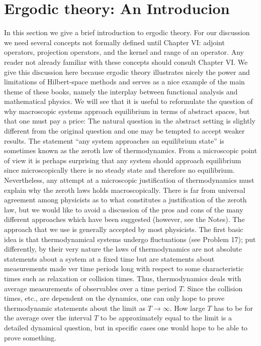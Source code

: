 \section{Ergodic theory: An Introducion}

In this section we give a brief introduction to ergodic theory. For our discussion we need several concepts not formally defined until Chapter VI: adjoint operators, projection operators, and the kernel and range of an operator. Any reader not already familiar with these concepts should consult Chapter VI. We give this discussion here because ergodic theory illustrates nicely the power and limitations of Hilbert-space methods and serves as a nice example of the main theme of these books, namely the interplay between functional analysis and mathematical physics. We will see that it is useful to reformulate the question of why macroscopic systems approach equilibrium in terms of abstract spaces, but that one must pay a price: The natural question in the abstract setting is slightly different from the original question and one may be tempted to accept weaker results. The statement \enquote{any system approaches an equilibrium state} is sometimes known as the zeroth law of thermodynamics. From a microscopic point of view it is perhaps surprising that any system should approach equilibrium since microscopically there is no steady state and therefore no equilibrium.
Nevertheless, any attempt at a microscopic justification of thermodynamics must explain why the zeroth laws holds macroscopically. There is far from universal agreement among physicists as to what constitutes a justification of the zeroth law, but we would like to avoid a discussion of the pros and cons of the many different approaches which have been suggested (however, see the Notes). The approach that we use is generally accepted by most physicists. The first basic idea is that thermodynamical systems undergo fluctuations (see Problem 17); put differently, by their very nature the laws of thermodynamics are not absolute statements about a system at a fixed time but are statements about measurements made ver time periods long with respect to some characteristic times such as relaxation or collision times. Thus, thermodynamics deals with average measurements of observables over a time period $T$. Since the collision times, etc., are dependent on the dynamics, one can only hope to prove thermodynamic statements about the limit as $T \rightarrow \infty$.
How large $T$ has to be for the average over the interval $T$ to be approximately equal to the limit is a detailed dynamical question, but in specific cases one would hope to be able to prove something.
